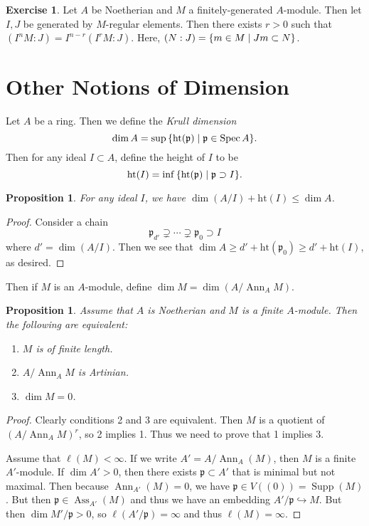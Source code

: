 \documentclass[leqno, openany]{memoir}
\newtheorem{prop}[thm]{Proposition}
\theoremstyle{definition}
\newtheorem{exer}[thm]{Exercise}
\theoremstyle{remark}
\theoremstyle{plain}
\theoremstyle{definition}
\theoremstyle{remark}
\newcommand{\mf}[1]{\mathfrak{#1}}
\newcommand{\mr}[1]{\mathrm{#1}}
\DeclareMathOperator{\Supp}{Supp}
\DeclareMathOperator{\Spec}{Spec}
\DeclareMathOperator{\Ann}{Ann}
\DeclareMathOperator{\Ass}{Ass}
\begin{document}
\begin{exer}
    Let $A$ be Noetherian and $M$ a finitely-generated $A$-module. Then let $I, J$ be generated by $M$-regular elements. Then there exists $r > 0$ such that $(I^n M : J) = I^{n-r} (I^r M : J)$. Here, $(N:J) = \qty{ m \in M \mid Jm \subset N }$.
\end{exer}

\section{Other Notions of Dimension}%
\label{sec:other_notions_of_dimension}

Let $A$ be a ring. Then we define the \textit{Krull dimension} 
\[ \dim A = \sup \qty{ \mr{ht}(\mf{p}) \mid \mf{p} \in \Spec A }. \]
Then for any ideal $I \subset A$, define the height of $I$ to be
\[ \mr{ht}(I) = \inf \qty{\mr{ht}(\mf{p}) \mid \mf{p} \supset I}. \]

\begin{prop}
    For any ideal $I$, we have $\dim ( A/I ) + \mr{ht}(I) \leq \dim A$.
\end{prop}

\begin{proof}
    Consider a chain
    \[ \mf{p}_{d'} \supsetneq \cdots \supsetneq \mf{p}_0 \supset I \]
    where $d' = \dim(A/I)$. Then we see that $\dim A \geq d' + \mr{ht}(\mf{p}_0) \geq d' + \mr{ht}(I)$, as desired.
\end{proof}

Then if $M$ is an $A$-module, define $\dim M = \dim ( A / \Ann_A M )$.

\begin{prop}
    Assume that $A$ is Noetherian and $M$ is a finite $A$-module. Then the following are equivalent:
    \begin{enumerate}
        \item $M$ is of finite length.
        \item $A / \Ann_A M$ is Artinian.
        \item $\dim M = 0$.
    \end{enumerate}
\end{prop}

\begin{proof}
    Clearly conditions 2 and 3 are equivalent. Then $M$ is a quotient of $(A/\Ann_A M)^r$, so 2 implies 1. Thus we need to prove that 1 implies 3.

    Assume that $\ell(M) < \infty$. If we write $A' = A/\Ann_A(M)$, then $M$ is a finite $A'$-module. If $\dim A' > 0$, then there exists $\mf{p} \subset A'$ that is minimal but not maximal. Then because $\Ann_{A'}(M) = 0$, we have $\mf{p} \in V((0)) = \Supp(M)$. But then $\mf{p} \in \Ass_{A'}(M)$ and thus we have an embedding $A' / \mf{p} \hookrightarrow M$. But then $\dim M' / \mf{p} > 0$, so $\ell(A' / \mf{p}) = \infty$ and thus $\ell(M) = \infty$.
\end{proof}
\end{document}
